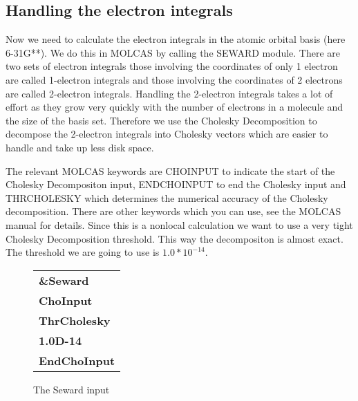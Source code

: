 \documentclass{article}
\begin{document}
\subsection{Handling the electron integrals}





Now we need to calculate the electron integrals in the atomic orbital basis (here 6-31G**). We do this in MOLCAS by calling the SEWARD module. There are two sets of electron integrals those involving the coordinates of only 1 electron are called 1-electron integrals and those involving the coordinates of 2 electrons are called 2-electron integrals. Handling the 2-electron integrals takes a lot of effort as they grow very quickly with the number of electrons in a molecule and the size of the basis set. Therefore we use the Cholesky Decomposition to decompose the 2-electron integrals into Cholesky vectors which are easier to handle and take up less disk space. 

The relevant MOLCAS keywords are CHOINPUT to indicate the start of the Cholesky Decompositon input, ENDCHOINPUT to end the Cholesky input and THRCHOLESKY which determines the numerical accuracy of the Cholesky decomposition. There are other keywords which you can use, see the MOLCAS manual for details. Since this is a nonlocal calculation we want to use a very tight Cholesky Decomposition threshold. This way the decompositon is almost exact. The threshold we are going to use is $1.0*10^{-14}$. 

\begin{figure}[h!]
	\begin{tabular}{l}
		\textbf{\&Seward} \\
		\textbf{ChoInput} \\
		\textbf{ThrCholesky} \\
		\textbf{1.0D-14} \\
		\textbf{EndChoInput} \\
	\end{tabular}
	\centering
	\caption{The Seward input}
\end{figure}
\end{document}
